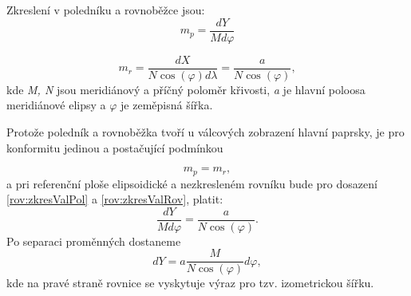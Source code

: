 \documentclass[11pt,a4paper]{article}
\begin{document}
Zkreslení v poledníku a rovnoběžce jsou:
\begin{equation}
m_{p} = \dfrac{dY}{M d\varphi}
\label{rov:zkresValPol}
\end{equation}

\begin{equation}
m_{r} = \dfrac{dX}{N \cos{\left(\varphi\right)d\lambda}} = \dfrac{a}{N\cos{\left(\varphi\right)}},
\label{rov:zkresValRov}
\end{equation}
kde \textit{M, N} jsou meridiánový a příčný poloměr křivosti, \textit{a} je hlavní poloosa meridiánové elipsy a $\varphi$ je zeměpisná šířka.

Protože poledník a rovnoběžka tvoří u válcových zobrazení hlavní paprsky, je pro konformitu jedinou a postačující podmínkou

$$m_{p} = m_{r},$$ 
a pri referenční ploše elipsoidické a nezkresleném rovníku bude pro dosazení \ref{rov:zkresValPol} a \ref{rov:zkresValRov}, platit:
\begin{equation}
\dfrac{dY}{M d\varphi} = \dfrac{a}{N\cos{\left(\varphi\right)}}.
\end{equation}
Po separaci proměnných dostaneme
\begin{equation}
dY = a\dfrac{M}{N\cos{\left(\varphi\right)}}d\varphi,
\label{rov:dY}
\end{equation}
kde na pravé straně rovnice se vyskytuje výraz pro tzv. izometrickou šířku.
\end{document}
